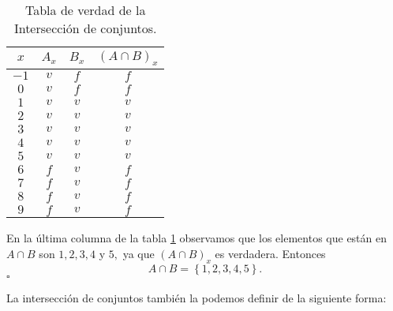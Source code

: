 \begin{table}[H]
\centering

\caption{Tabla de verdad de la Intersección de conjuntos.}

\setlength\arrayrulewidth{1pt} 

\begin{tabular}{ccc|c}
\arrayrulecolor{ptctitle}\hline\cellcolor{ptctitle!50}$x$ &
\cellcolor{ptctitle!50}$A_{x}$ &
\cellcolor{ptctitle!50}$B_{x}$ &
\cellcolor{ptctitle!50}$\left(A\cap B\right)_{x}$\tabularnewline
\hline\cellcolor{ptcbackground}$-1$ &
\cellcolor{ptcbackground} $v$ &
\cellcolor{ptcbackground} $f$ &
\cellcolor{ptcbackground}$f$\tabularnewline
\hline\cellcolor{gray!50}$0$ &
\cellcolor{gray!50} $v$ &
\cellcolor{gray!50} $f$ &
\cellcolor{gray!50}$f$\tabularnewline
\hline\cellcolor{ptcbackground}$1$ &
\cellcolor{ptcbackground} $v$ &
\cellcolor{ptcbackground} $v$ &
\cellcolor{ptcbackground}$v$\tabularnewline
\hline\cellcolor{gray!50}$2$ &
\cellcolor{gray!50} $v$ &
\cellcolor{gray!50} $v$ &
\cellcolor{gray!50}$v$\tabularnewline
\hline\cellcolor{ptcbackground}$3$ &
\cellcolor{ptcbackground} $v$ &
\cellcolor{ptcbackground} $v$ &
\cellcolor{ptcbackground} $v$\tabularnewline
\hline\cellcolor{gray!50}$4$ &
\cellcolor{gray!50} $v$ &
\cellcolor{gray!50} $v$ &
\cellcolor{gray!50} $v$\tabularnewline
\hline\cellcolor{ptcbackground}$5$ &
\cellcolor{ptcbackground} $v$ &
\cellcolor{ptcbackground} $v$ &
\cellcolor{ptcbackground} $v$\tabularnewline
\hline\cellcolor{gray!50}$6$ &
\cellcolor{gray!50} $f$ &
\cellcolor{gray!50} $v$ &
\cellcolor{gray!50} $f$\tabularnewline
\hline\cellcolor{ptcbackground}$7$ &
\cellcolor{ptcbackground} $f$ &
\cellcolor{ptcbackground} $v$ &
\cellcolor{ptcbackground} $f$\tabularnewline
\hline\cellcolor{gray!50}$8$ &
\cellcolor{gray!50} $f$ &
\cellcolor{gray!50} $v$ &
\cellcolor{gray!50} $f$\tabularnewline
\hline\cellcolor{ptcbackground}$9$ &
\cellcolor{ptcbackground} $f$ &
\cellcolor{ptcbackground} $v$ &
\cellcolor{ptcbackground} $f$\tabularnewline
\end{tabular}

\label{tinter}
\end{table}

En la última columna de la tabla \ref{tinter} observamos que los
elementos que están en $A\cap B$ son $1,2,3,4$ y $5,$ ya que $\left(A\cap B\right)_{x}$
es verdadera. Entonces
\[
A\cap B=\left\{ 1,2,3,4,5\right\} .
\]
\hfill $\square$

\obs  La intersección de conjuntos también la podemos definir de
la siguiente forma:

